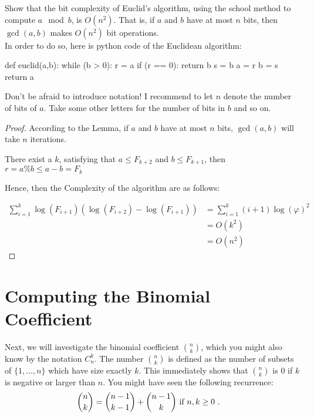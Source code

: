 \documentclass[11pt,a4paper,oneside]{article}
\begin{document}
\begin{problem}{2}
\statement
Show that the bit complexity of Euclid's algorithm, using the school method
to compute $a \mod b$, is $O(n^2)$. That is,
if $a$ and $b$ have at most $n$ bits, then $\gcd(a,b)$ makes $O(n^2)$ bit operations.\\

In order to do so, here is python code of the Euclidean algorithm:
\begin{python}
def euclid(a,b):
	while (b > 0):
		r = a %
		if (r == 0):
			return b
		s = b %
		a = r
		b = s
  	return a
\end{python}
Don't be afraid to introduce notation! I recommend to let $n$ denote the number of bits of $a$.
Take some other letters for the number of bits in $b$ and so on.
\solution
\begin{proof}
According to the Lemma, if \(a \) and \(b \) have at most \(n\) bits, \( \gcd(a, b) \) will take \( n \) iterations.

There exist a \( k \), satisfying that \(a \leq F_{k + 2} \) and \(b \leq F_{k + 1} \), then \( r = a \% b \leq a - b = F_{k} \)

Hence, then the Complexity of the algorithm are as follows:

\[
	\begin{split}
		\sum_{i = 1}^k \log(F_{i+1})(\log(F_{i + 2}) - \log(F_{i + 1})) &= \sum_{i=1}^k (i + 1)\log(\varphi)^2 \\
		&= O(k^2) \\
		&= O(n^2)
	\end{split}
\]
\end{proof}
\end{problem}
\section*{Computing the Binomial Coefficient}

    Next, we will investigate the binomial coefficient ${n \choose k}$, which 
    you might also know by the notation $C^k_n$. The number ${n \choose k}$ is defined
    as the number of subsets of $\{1,\dots,n\}$ which have size exactly $k$. 
    This immediately shows that ${n \choose k}$ is $0$ if $k$ is negative or larger than $n$.
    You might have seen the following recurrence:
    \begin{align*}
     {n \choose k} & = {n-1 \choose k-1} + {n-1 \choose k} \textnormal{ if } n,k \geq 0 \ .
    \end{align*}
\end{document}
